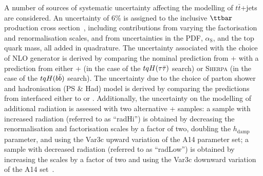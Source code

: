 A number of sources of systematic uncertainty affecting the modelling of $t\bar{t}$+jets are considered. 
An uncertainty of  6\% is assigned to the inclusive $\ttbar$ production
cross section~\cite{Czakon:2011xx}, including contributions from varying the factorisation and renormalisation 
scales, and from uncertainties in the PDF, $\alpha_{\textrm{S}}$, and the top quark mass, all added in quadrature. 
The uncertainty associated with the choice of NLO generator is derived by comparing the nominal prediction from
{\powheg}+{\pythiaeight} with a prediction from either {\amcatnlo}+{\pythiaeight} (in the case of the $tqH(\tau\bar{\tau})$ search) or
\textsc{Sherpa} (in the case of the $tqH(b\bar{b})$ search). 
The uncertainty due to the choice of parton shower and hadronisation (PS \& Had) model is derived 
by comparing the predictions from {\powheg} interfaced either to {\pythiaeight} or {}. 
Additionally, the uncertainty on the modelling of additional radiation is assessed with two alternative {\powheg}+{\pythiaeight} samples:
a sample with increased radiation (referred to as ``radHi'') is obtained by decreasing the renormalisation and factorisation scales  
by a factor of two, doubling the $h_{\textrm{damp}}$ parameter, and using the Var3c upward variation of the A14 parameter set;
a sample with decreased radiation (referred to as ``radLow'') is obtained by increasing the scales by a factor of two 
and using the Var3c downward variation of the A14 set~\cite{ATL-PHYS-PUB-2016-004}.

